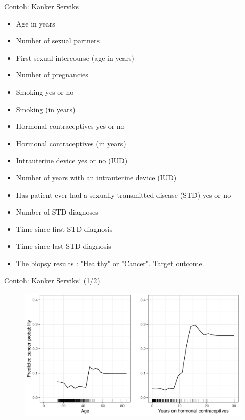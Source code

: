 \documentclass[aspectratio=169]{beamer}
\begin{document}
\begin{frame}{Contoh: Kanker Serviks \citep{cervical_cancer_(risk_factors)_383}}
	\begin{multicols}{2} 
	\begin{itemize}
		\item  \footnotesize Age in years
		\item  \footnotesize Number of sexual partners
		\item  \footnotesize First sexual intercourse (age in years)
		\item  \footnotesize Number of pregnancies
		\item  \footnotesize Smoking yes or no
		\item  \footnotesize Smoking (in years)
		\item  \footnotesize Hormonal contraceptives yes or no
	\end{itemize}
	\columnbreak
	\begin{itemize}
		\item  \footnotesize Hormonal contraceptives (in years)
\item  \footnotesize Intrauterine device yes or no (IUD)
\item  \footnotesize Number of years with an intrauterine device (IUD)
\item  \footnotesize Has patient ever had a sexually transmitted disease (STD) yes or no
\item  \footnotesize Number of STD diagnoses
\item  \footnotesize Time since first STD diagnosis
\item  \footnotesize Time since last STD diagnosis
\item  \footnotesize The biopsy results : "Healthy" or "Cancer". Target outcome.		
	\end{itemize}
\end{multicols}
\end{frame}

\begin{frame}{Contoh: Kanker Serviks$^\dagger$ (1/2)}
	\begin{figure}[!ht]
	\centering
	\includegraphics[scale=.6]{images/pdp-cervical-1.jpeg}
\end{figure}
\end{frame}
\end{document}
